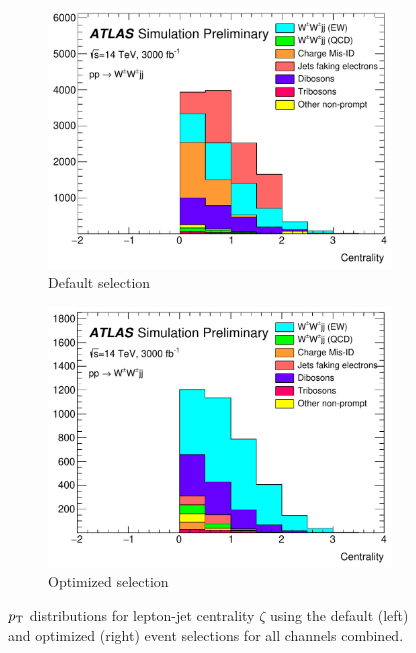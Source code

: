 \begin{figure}[htbp]
  \centering
  \begin{subfigure}[b]{.48\textwidth}
    \includegraphics[width=\textwidth]{figs/ssww_upgrade/distributions/default/all_pass9_lepjet_centrality-cropped}
    \caption{Default selection}
    \label{fig:sswwupgrade_centrality_compare_d}
  \end{subfigure}
  \begin{subfigure}[b]{.4792\textwidth}
  \includegraphics[width=\textwidth]{figs/ssww_upgrade/distributions/optimized/all_pass9_lepjet_centrality-cropped}
    \caption{Optimized selection}
    \label{fig:sswwupgrade_centrality_compare_o}
  \end{subfigure}
  \caption{$p_{\mathrm{T}}$ distributions for lepton-jet centrality $\zeta$ using the default (left) and optimized (right) event selections for all channels combined.}
  \label{fig:sswwupgrade_centrality_compare}
\end{figure}

